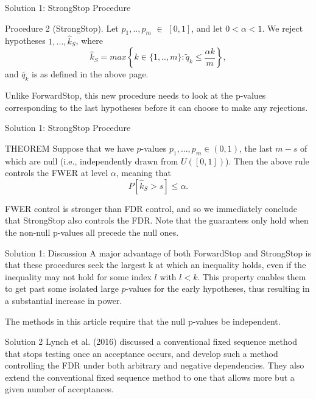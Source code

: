 \documentclass{beamer}
\begin{document}
\begin{frame}[t]{Solution 1: StrongStop Procedure }\vspace{10pt}
\begin{block}{Procedure 2 (StrongStop). }
Let $p_1,..,p_m$ $\in$ $[0,1]$, and let $0 < \alpha <1$. We reject hypotheses $1,..., \hat{k}_S$, where
$$  \hat{k}_S = max \left\{ k \in \{1,..,m\} : \tilde{q}_k \leq \frac{\alpha k}{m} \right\},$$ 
and $\tilde{q_k}$ is as defined in the above page.
\end{block}
Unlike ForwardStop, this new procedure needs to look at the p-values corresponding to the last hypotheses before it can choose to make any rejections.
\end{frame}

\begin{frame}[t]{Solution 1: StrongStop Procedure }\vspace{10pt}
\begin{block}{THEOREM}
	Suppose that we have $p$-values $p_1,...,p_m \in (0,1)$, the last $m-s$ of which are null (i.e., independently drawn from $U([0,1])$). Then the above rule controls  the FWER at level $\alpha$, meaning that
$$ P \left[\hat k_S > s \right] \leq \alpha. $$
\end{block}

\vspace{10pt}


FWER control is stronger than FDR control, and so we immediately conclude that StrongStop also controls the FDR. Note that the guarantees only hold when the non-null p-values all precede the null ones.
\end{frame}

\begin{frame}[t]{Solution 1: Discussion}\vspace{10pt}
A major advantage of both ForwardStop and StrongStop is that these procedures seek the largest k at which an inequality holds, even if the inequality may not hold for some index $l$ with $l < k$. This property enables them to get past some isolated large $p$-values for the early hypotheses, thus resulting in a substantial increase in power. 

The methods in this article require that the null p-values be independent.

\end{frame}

\begin{frame}[t]{Solution 2}\vspace{10pt}
Lynch et al. (2016) discussed a conventional fixed sequence method that stops testing once an acceptance occurs, and develop such a method controlling the FDR under both arbitrary and negative dependencies. They also extend the conventional fixed sequence method to one that allows more but a given number of acceptances.
\end{frame}
\end{document}
